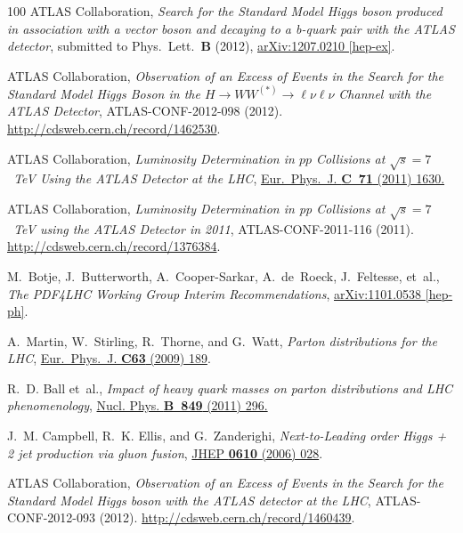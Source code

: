 \documentclass[final,3p,times,twocolumn]{elsarticle}
\begin{document}
\begin{thebibliography}{100}
{ATLAS} Collaboration, {\em {Search for the Standard Model Higgs boson produced
  in association with a vector boson and decaying to a b-quark pair with the
  ATLAS detector}}, submitted to Phys.~Lett.~{\bf B} (2012),
  \href{http://arxiv.org/abs/1207.0210}{{\ttfamily arXiv:1207.0210 [hep-ex]}}.

{{ATLAS}} Collaboration, {\em Observation of an Excess of Events in the Search
  for the Standard Model Higgs Boson in the $H\to WW^{(\ast)}\to
  \ell\nu\ell\nu$ Channel with the ATLAS Detector}, ATLAS-CONF-2012-098 (2012).
  \url{http://cdsweb.cern.ch/record/1462530}.

{ATLAS Collaboration}, {\em {Luminosity Determination in $pp$ Collisions at
  $\sqrt{s} = 7$~TeV Using the ATLAS Detector at the LHC}}, 
  \href{http://dx.doi.org/10.1140/epjc/s10052-011-1630-5}{Eur.~Phys.~J.
  {\bfseries C~71} (2011) 1630.}


{ATLAS Collaboration}, {\em {Luminosity Determination in pp Collisions at
  $\sqrt{s} = 7$~TeV using the ATLAS Detector in 2011}}, {ATLAS-CONF-2011-116}
  (2011). \url{http://cdsweb.cern.ch/record/1376384}.

M.~Botje, J.~Butterworth, A.~Cooper-Sarkar, A.~de~Roeck, J.~Feltesse, {et~al.},
  {\em {The PDF4LHC Working Group Interim Recommendations}},
  \href{http://arxiv.org/abs/1101.0538}{{\ttfamily arXiv:1101.0538 [hep-ph]}}.

A.~Martin, W.~Stirling, R.~Thorne, and G.~Watt, {\em {Parton distributions for
  the LHC}},
\href{http://dx.doi.org/10.1140/epjc/s10052-009-1072-5}{Eur.~Phys.~J. {\bfseries
  C63} (2009) 189}.

R.~D. Ball {et~al.}, {\em {Impact of heavy quark masses on parton distributions
  and LHC phenomenology}}, 
  \href{http://dx.doi.org/10.1016/j.nuclphysb.2011.03.021}
  {Nucl. Phys. {\bfseries B~849} (2011) 296.}

J.~M. Campbell, R.~K. Ellis, and G.~Zanderighi, {\em {Next-to-Leading order
  Higgs + 2 jet production via gluon fusion}},
  \href{http://dx.doi.org/10.1088/1126-6708/2006/10/028}{JHEP {\bfseries 0610}
  (2006) 028}.

{{ATLAS}} Collaboration, {\em Observation of an Excess of Events in the Search
  for the Standard Model Higgs boson with the ATLAS detector at the LHC},
  ATLAS-CONF-2012-093 (2012). \url{http://cdsweb.cern.ch/record/1460439}.


\end{thebibliography}
\end{document}

